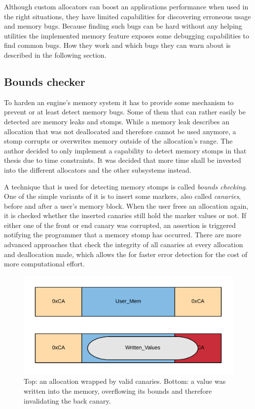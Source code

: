 Although custom allocators can boost an applications performance when used in the right situations, they have limited capabilities for discovering erroneous usage and memory bugs. Because finding such bugs can be hard without any helping utilities the implemented memory feature exposes some debugging capabilities to find common bugs. How they work and which bugs they can warn about is described in the following section.

\subsection{Bounds checker}

To harden an engine's memory system it has to provide some mechanism to prevent or at least detect memory bugs. Some of them that can rather easily be detected are memory leaks and stomps. While a memory leak describes an allocation that was not deallocated and therefore cannot be used anymore, a stomp corrupts or overwrites memory outside of the allocation's range. The author decided to only implement a capability to detect memory stomps in that thesis due to time constraints. It was decided that more time shall be invested into the different allocators and the other subsystems instead.

A technique that is used for detecting memory stomps is called \textit{bounds checking}. One of the simple variants of it is to insert some markers, also called \textit{canaries}, before and after a user's memory block. When the user frees an allocation again, it is checked whether the inserted canaries still hold the marker values or not. If either one of the front or end canary was corrupted, an assertion is triggered notifying the programmer that a memory stomp has occurred. There are more advanced approaches that check the integrity of all canaries at every allocation and deallocation made, which allows the for faster error detection for the cost of more computational effort. 

\begin{figure}[h!]
	\centering \includegraphics[width=0.8\linewidth]{PICs/canaries.png}
	\caption{Top: an allocation wrapped by valid canaries. Bottom: a value was written into the memory, overflowing its bounds and therefore invalidating the back canary.}
	\label{fig:canaries}
\end{figure}

